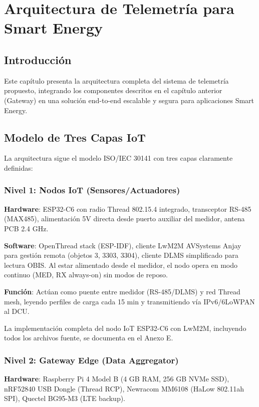 ﻿\chapter{Arquitectura de Telemetría para Smart Energy}

\section{Introducción}

Este capítulo presenta la arquitectura completa del sistema de telemetría propuesto, integrando los componentes descritos en el capítulo anterior (Gateway) en una solución end-to-end escalable y segura para aplicaciones Smart Energy.

\section{Modelo de Tres Capas IoT}

La arquitectura sigue el modelo ISO/IEC 30141 con tres capas claramente definidas:

\subsection{Nivel 1: Nodos IoT (Sensores/Actuadores)}

\textbf{Hardware}: ESP32-C6 con radio Thread 802.15.4 integrado, transceptor RS-485 (MAX485), alimentación 5V directa desde puerto auxiliar del medidor, antena PCB 2.4 GHz.

\textbf{Software}: OpenThread stack (ESP-IDF), cliente LwM2M AVSystems Anjay para gestión remota (objetos 3, 3303, 3304), cliente DLMS simplificado para lectura OBIS. Al estar alimentado desde el medidor, el nodo opera en modo continuo (MED, RX always-on) sin modos de reposo.

\textbf{Función}: Actúan como puente entre medidor (RS-485/DLMS) y red Thread mesh, leyendo perfiles de carga cada 15 min y transmitiendo vía IPv6/6LoWPAN al DCU.

La implementación completa del nodo IoT ESP32-C6 con LwM2M, incluyendo todos los archivos fuente, se documenta en el Anexo E.

\subsection{Nivel 2: Gateway Edge (Data Aggregator)}

\textbf{Hardware}: Raspberry Pi 4 Model B (4 GB RAM, 256 GB NVMe SSD), nRF52840 USB Dongle (Thread RCP), Newracom MM6108 (HaLow 802.11ah SPI), Quectel BG95-M3 (LTE backup).

